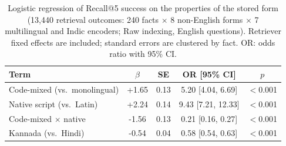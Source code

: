 \begin{table}[t]
\centering
\small
\caption{Logistic regression of Recall@5 success on the properties of the stored form (13,440 retrieval outcomes: 240 facts $\times$ 8 non-English forms $\times$ 7 multilingual and Indic encoders; Raw indexing, English questions). Retriever fixed effects are included; standard errors are clustered by fact. OR: odds ratio with 95\% CI.}
\label{tab:regression}
\begin{tabular}{@{}l c c c c@{}}
\toprule
Term & $\beta$ & SE & OR [95\% CI] & $p$ \\
\midrule
Code-mixed (vs.\ monolingual) & +1.65 & 0.13 & 5.20 [4.04, 6.69] & $<$0.001 \\
Native script (vs.\ Latin) & +2.24 & 0.14 & 9.43 [7.21, 12.33] & $<$0.001 \\
Code-mixed $\times$ native & -1.56 & 0.13 & 0.21 [0.16, 0.27] & $<$0.001 \\
Kannada (vs.\ Hindi) & -0.54 & 0.04 & 0.58 [0.54, 0.63] & $<$0.001 \\
\bottomrule
\end{tabular}
\end{table}
